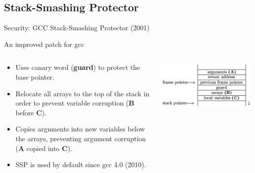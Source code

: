 \subsection{Stack-Smashing Protector}
\begin{frame}{Security: GCC Stack-Smashing Protector (2001)}
	\begin{block}{An improved patch for gcc}
		\begin{columns}
			\begin{column}{.5\textwidth}
		\begin{itemize}
			\item Uses canary word (\textbf{guard}) to protect the base pointer.
			\item Relocate all arrays to the top of the stack in order to prevent variable corruption (\textbf{B} before \textbf{C}).
			\item Copies arguments into new variables below the arrays, preventing argument corruption (\textbf{A} copied into \textbf{C}).
			\item SSP is used by default since gcc 4.0 (2010).
		\end{itemize}
			\end{column}
			\begin{column}{.5\textwidth}
				\includegraphics[width=\textwidth]{imgs/sec-ssp.png}
			\end{column}
		\end{columns}
	\end{block}

\end{frame}

